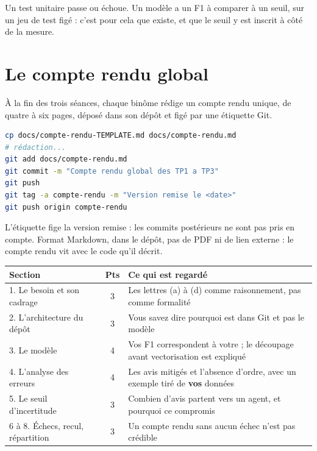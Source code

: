 \documentclass[11pt,a4paper]{article}
\newcommand{\co}[1]{\texttt{\detokenize{#1}}}
\begin{document}
Un test unitaire passe ou échoue. Un modèle a un F1 à comparer à un seuil, sur un jeu de test figé :
c'est pour cela que \co{metrics.json} existe, et que le seuil y est inscrit à côté de la mesure.

\section{Le compte rendu global}

À la fin des trois séances, chaque binôme rédige un compte rendu unique, de quatre à six pages,
déposé dans son dépôt et figé par une étiquette Git.

\begin{lstlisting}[language=bash]
cp docs/compte-rendu-TEMPLATE.md docs/compte-rendu.md
# rédaction...
git add docs/compte-rendu.md
git commit -m "Compte rendu global des TP1 a TP3"
git push
git tag -a compte-rendu -m "Version remise le <date>"
git push origin compte-rendu
\end{lstlisting}

L'étiquette fige la version remise : les commits postérieurs ne sont pas pris en compte. Format
Markdown, dans le dépôt, pas de PDF ni de lien externe : le compte rendu vit avec le code qu'il
décrit.

\begin{center}
\begin{longtable}{@{}p{5.6cm}cp{8.4cm}@{}}
\toprule
\textbf{Section} & \textbf{Pts} & \textbf{Ce qui est regardé} \\
\midrule
\endhead
1. Le besoin et son cadrage & 3 & Les lettres (a) à (d) comme raisonnement, pas comme formalité \\
2. L'architecture du dépôt & 3 & Vous savez dire pourquoi \co{metrics.json} est dans Git et pas le modèle \\
3. Le modèle & 4 & Vos F1 correspondent à votre \co{metrics.json} ; le découpage avant vectorisation est expliqué \\
4. L'analyse des erreurs & 4 & Les avis mitigés et l'absence d'ordre, avec un exemple tiré de \textbf{vos} données \\
5. Le seuil d'incertitude & 3 & Combien d'avis partent vers un agent, et pourquoi ce compromis \\
6 à 8. Échecs, recul, répartition & 3 & Un compte rendu sans aucun échec n'est pas crédible \\
\bottomrule
\end{longtable}
\end{center}
\end{document}
